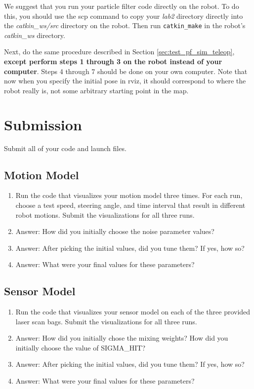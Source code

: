 \documentclass[final]{article}
\begin{document}
We suggest that you run your particle filter code directly on the robot. To do this, you should use the scp command to copy your \textit{lab2} directory directly into the \textit{catkin\_ws/src} directory on the robot. Then run \texttt{catkin\_make} in the robot's \textit{catkin\_ws} directory.

Next, do the same procedure described in Section \ref{sec:test_pf_sim_teleop}, \textbf{except perform steps 1 through 3 on the robot instead of your computer}. Steps 4 through 7 should be done on your own computer. Note that now when you specify the initial pose in rviz, it should correspond to where the robot really is, not some arbitrary starting point in the map.

\section{Submission}

Submit all of your code and launch files.

\subsection{Motion Model}
\begin{enumerate}
\item Run the code that visualizes your motion model three times. For each run, choose a test speed, steering angle, and time interval that result in different robot motions. Submit the visualizations for all three runs.
\item Answer: How did you initially choose the noise parameter values?
\item Answer: After picking the initial values, did you tune them? If yes, how so?
\item Answer: What were your final values for these parameters?
\end{enumerate}

\subsection{Sensor Model}
\begin{enumerate}
\item Run the code that visualizes your sensor model on each of the three provided laser scan bags. Submit the visualizations for all three runs.
\item Answer: How did you initially chose the mixing weights? How did you initially choose the value of SIGMA\_HIT?
\item Answer: After picking the initial values, did you tune them? If yes, how so?
\item Answer: What were your final values for these parameters?
\end{enumerate}
\end{document}
